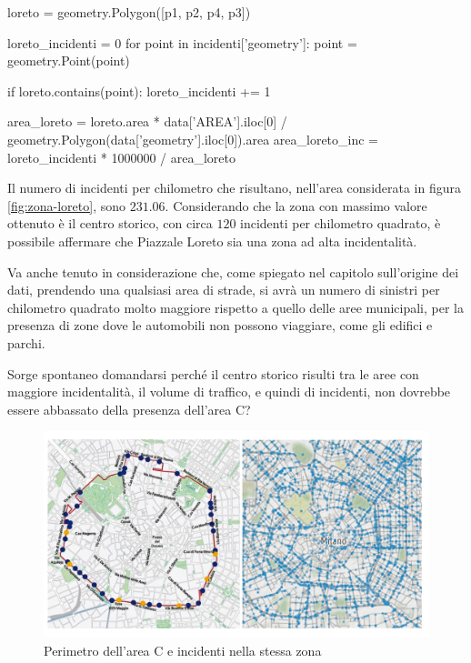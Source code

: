 \documentclass[a4paper,12pt]{report}
\begin{document}
\begin{code}
loreto = geometry.Polygon([p1, p2, p4, p3])

loreto_incidenti = 0
for point in incidenti['geometry']: 
    point = geometry.Point(point)

    if loreto.contains(point): 
        loreto_incidenti += 1

area_loreto = loreto.area * data['AREA'].iloc[0] / geometry.Polygon(data['geometry'].iloc[0]).area
area_loreto_inc = loreto_incidenti * 1000000 / area_loreto
\end{code}

Il numero di incidenti per chilometro che risultano, nell'area considerata in figura 
\ref{fig:zona-loreto}, sono $231.06$. 
Considerando che la zona con massimo valore ottenuto è il centro storico, 
con circa $120$ incidenti per chilometro quadrato, è possibile affermare 
che Piazzale Loreto sia una zona ad alta incidentalità. 

Va anche tenuto in considerazione che, come spiegato nel capitolo sull'origine dei dati, 
prendendo una qualsiasi area di strade, si avrà un numero di sinistri per chilometro quadrato 
molto maggiore rispetto a quello delle aree municipali, per la presenza di zone dove  
le automobili non possono viaggiare, come gli edifici e parchi. 

Sorge spontaneo domandarsi perché il centro storico risulti tra le aree con maggiore 
incidentalità, il volume di traffico, e quindi di incidenti, non dovrebbe essere abbassato 
della presenza dell'area C?

\begin{figure}
    \includegraphics[width=\linewidth]{../src/area_c/area_c_incidenti.png}
    \caption{Perimetro dell'area C e incidenti nella stessa zona}
    \label{fig:perimetro-area-c}
\end{figure}
\end{document}
